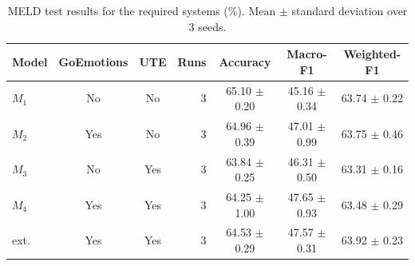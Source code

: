 \begin{table}[t]
\centering
\caption{MELD test results for the required systems (\%). Mean $\pm$ standard deviation over 3 seeds.}
\label{tab:main}
\begin{tabular}{lccrccc}
\toprule
Model & GoEmotions & UTE & Runs & Accuracy & Macro-F1 & Weighted-F1 \\
\midrule
$M_1$ & No & No & 3 & 65.10 $\pm$ 0.20 & 45.16 $\pm$ 0.34 & 63.74 $\pm$ 0.22 \\
$M_2$ & Yes & No & 3 & 64.96 $\pm$ 0.39 & 47.01 $\pm$ 0.99 & 63.75 $\pm$ 0.46 \\
$M_3$ & No & Yes & 3 & 63.84 $\pm$ 0.25 & 46.31 $\pm$ 0.50 & 63.31 $\pm$ 0.16 \\
$M_4$ & Yes & Yes & 3 & 64.25 $\pm$ 1.00 & 47.65 $\pm$ 0.93 & 63.48 $\pm$ 0.29 \\
ext. & Yes & Yes & 3 & 64.53 $\pm$ 0.29 & 47.57 $\pm$ 0.31 & 63.92 $\pm$ 0.23 \\
\bottomrule
\end{tabular}
\end{table}
